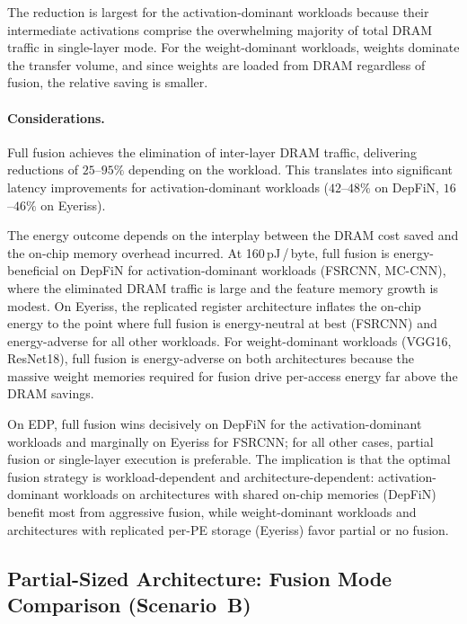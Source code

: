 The reduction is largest for the activation-dominant workloads
because their intermediate activations comprise the overwhelming
majority of total DRAM traffic in single-layer mode.
For the weight-dominant workloads, weights dominate the transfer
volume, and since weights are loaded from DRAM regardless of
fusion, the relative saving is smaller.

\paragraph{Considerations.}
Full fusion achieves the elimination of
inter-layer DRAM traffic, delivering reductions of
$25$--$95\%$ depending on the workload.
This translates into significant latency improvements for
activation-dominant workloads ($42$--$48\%$ on DepFiN,
$16$--$46\%$ on Eyeriss).

The energy outcome depends on the interplay between the DRAM cost
saved and the on-chip memory overhead incurred.
At 160\,pJ\,/\,byte, full fusion is energy-beneficial on DepFiN
for activation-dominant workloads (FSRCNN, MC-CNN), where the
eliminated DRAM traffic is large and the feature memory growth is
modest.
On Eyeriss, the replicated register architecture inflates the
on-chip energy to the point where full fusion is
energy-neutral at best (FSRCNN) and energy-adverse for all other
workloads.
For weight-dominant workloads (VGG16, ResNet18), full fusion is
energy-adverse on both architectures because the massive weight
memories required for fusion drive per-access energy far above
the DRAM savings.

On EDP, full fusion wins decisively on DepFiN for the
activation-dominant workloads and marginally on Eyeriss for
FSRCNN; for all other cases, partial fusion or single-layer
execution is preferable.
The implication is that the optimal fusion strategy is
workload-dependent and architecture-dependent: activation-dominant
workloads on architectures with shared on-chip memories (DepFiN)
benefit most from aggressive fusion, while weight-dominant
workloads and architectures with replicated per-PE storage
(Eyeriss) favor partial or no fusion.
\subsection{Partial-Sized Architecture: Fusion Mode Comparison
  (Scenario~B)}
\label{sec:fusion-partial-sized}

